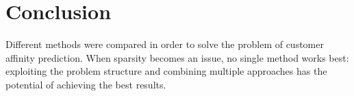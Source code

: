 \documentclass[10pt,twocolumn]{article}
\begin{document}
\section{Conclusion}
Different methods were compared in order to solve the problem of customer affinity prediction. When sparsity becomes an issue, no single method works best: exploiting the problem structure and combining multiple approaches has the potential of achieving the best results.


\end{document}
